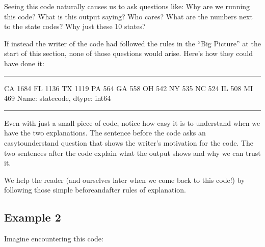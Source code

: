 \documentclass[letterpaper,10pt,english]{jupyterBook}
\begin{document}
\sphinxAtStartPar
Seeing this code naturally causes us to ask questions like:  Why are we running this code?  What is this output saying?  Who cares?  What are the numbers next to the state codes?  Why just these 10 states?  

\sphinxAtStartPar
If instead the writer of the code had followed the rules in the “Big Picture” at the start of this section, none of those questions would arise.  Here’s how they could have done it:


\bigskip\hrule\bigskip


\sphinxAtStartPar
{}

\begin{sphinxVerbatim}[commandchars=\\\{\}]
\PYG{p}{[}\PYG{p}{]}  
\end{sphinxVerbatim}

\begin{sphinxVerbatim}[commandchars=\\\{\}]
CA    1684
FL    1136
TX    1119
PA     564
GA     558
OH     542
NY     535
NC     524
IL     508
MI     469
Name: state\PYGZus{}code, dtype: int64
\end{sphinxVerbatim}

\sphinxAtStartPar
{}


\bigskip\hrule\bigskip


\sphinxAtStartPar
Even with just a small piece of code, notice how easy it is to understand when we have the two explanations.  The sentence before the code asks an easy\sphinxhyphen{}to\sphinxhyphen{}understand question that shows the writer’s motivation for the code.  The two sentences after the code explain what the output shows and why we can trust it.

\sphinxAtStartPar
We help the reader (and ourselves later when we come back to this code!) by following those simple before\sphinxhyphen{}and\sphinxhyphen{}after rules of explanation.


\subsection{Example 2}
\label{\detokenize{chapter-5-before-and-after:example-2}}
\sphinxAtStartPar
Imagine encountering this code:
\end{document}
